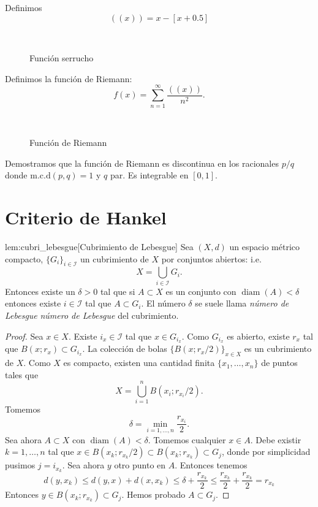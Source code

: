 \begin{ejemplo}{} Definimos
\[
 ((x))=x-[x+0.5]
\]

\begin{figure}[H]
\begin{center}
\\
 \caption{Función serrucho}
\end{center}
 \end{figure}


Definimos la función de Riemann:
\[
 f(x)=\sum_{n=1}^{\infty}\frac{((x))}{n^2}.
\]

\begin{figure}[H]
\begin{center}
\\
\caption{Función de Riemann}
 \end{center}
 \end{figure}
 
Demostramos que la función de Riemann es discontinua en los racionales $p/q$ donde $\text{m.c.d}(p,q)=1$ y $q$ par. Es integrable en $[0,1]$.  
 
\end{ejemplo}


\section{Criterio de Hankel}

\begin{lema}{lem:cubri_lebesgue}[Cubrimiento de Lebesgue] Sea $(X,d)$ un espacio métrico compacto, $\{G_i\}_{i\in\mathscr{I}}$ un cubrimiento de $X$ por conjuntos abiertos: i.e.
\[
 X=\bigcup_{i\in\mathscr{I}}G_i.
\]
Entonces existe un $\delta>0$ tal que si $A\subset X$ es un conjunto con $\operatorname{diam}(A)<\delta$ entonces existe $i\in\mathscr{I}$ tal que $A\subset G_i$. El número $\delta$ se suele llama  \emph{número de Lebesgue} \emph{número de Lebesgue} del cubrimiento.
 
\end{lema}
\begin{proof} Sea $x\in X$. Existe $i_x\in\mathscr{I}$ tal que $x\in G_{i_x}$. Como $G_{i_x}$ es abierto, existe $r_x$ tal que $B(x;r_x)\subset G_{i_x}$. La colección de bolas $\{B(x;r_x/2)\}_{x\in X}$ es un cubrimiento de $X$. Como $X$ es compacto, existen una cantidad finita $\{x_1,\ldots,x_n\}$ de puntos tales que
\[
 X=\bigcup_{i=1}^n B(x_i;r_{x_i}/2).
\]
Tomemos 
\[
 \delta=\min_{i=1,\ldots,n}\frac{r_{x_i}}{2}.
\]
Sea ahora $A\subset X$ con $\operatorname{diam}(A)<\delta$. Tomemos cualquier $x\in A$. Debe existir $k=1,\ldots,n$ tal que $x\in B(x_k;r_{x_k}/2)\subset B(x_k;r_{x_k})\subset G_j$, donde por simplicidad pusimos $j=i_{x_k}$. Sea ahora $y$ otro punto en $A$. Entonces tenemos
\[
 d(y,x_k)\leq d(y,x)+d(x,x_k)\leq\delta + \frac{r_{x_k}}{2}\leq\frac{r_{x_k}}{2}+ \frac{r_{x_k}}{2}=r_{x_k}
\]
Entonces $y\in B(x_k;r_{x_k})\subset  G_j$. Hemos probado $A\subset G_j$. 
\end{proof}




